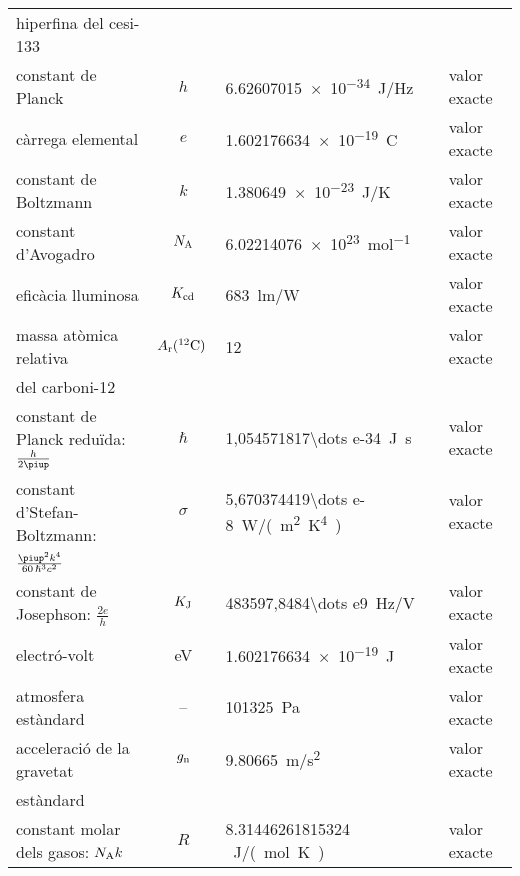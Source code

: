 \begin{ThreePartTable}
\begin{longtable}{lcll}
	hiperfina del cesi-133 & & & \index{$\Deltaup\nu\ped{Cs}$}\\[0.8em]
	constant de Planck & $h$ & \qty{6,62607015 e-34}{J/Hz} & valor exacte\index{constants!de Planck}\index{h@$h$}\\[0.8em]
	càrrega elemental & $e$ & \qty{1,602176634 e-19}{C} & valor exacte\index{carrega@càrrega!elemental}\index{e@$e$}\\[0.8em]
	constant de Boltzmann & $k$ & \qty{1,380649e-23}{J/K} & valor exacte\index{constants!de Boltzmann}\index{k@$k$}\\[0.8em]
	constant d'Avogadro\tnote{\color{blue}(a)} & $N\ped{A}$ & \qty{6,02214076 e23}{mol^{-1}} & valor exacte\index{constants!d'Avogadro}\index{NA@$N\ped{A}$}\\[0.8em]
	eficàcia lluminosa\tnote{\color{blue}(b)} & $K\ped{cd}$ & \qty{683}{lm/W} & valor exacte\index{eficàcia lluminosa}\index{Kcd@$K\ped{cd}$}\\[0.8em]
	massa atòmica relativa\tnote{\color{blue}(c)} & $A_\mathrm{r}({}^{12}\mathrm{C})\,$ & 12 & valor exacte\\
	del carboni-12 & & &\index{massa!atòmica relativa del carboni-12}\index{Ar@$A\ped{r}({}^{12}\mathrm{C})$}\\[0.8em]
	constant de Planck reduïda: $\frac{h}{2\piup}$ & $\hslash$ & \qty{1,054571817\dots e-34}{J.s} & valor exacte\index{constants!de Planck redu\"{i}da}\index{h@$\hslash$}\\[0.8em]
	constant d'Stefan-Boltzmann:  & $\sigma$ & \qty{5,670374419\dots e-8}{W/(m^2.K^4)} & valor exacte\index{constants!d'Stefan-Boltzmann}\index{$\sigma$}\\ 
	$\frac{\piup^2 k^4}{60\, \hslash^3 c^2}$ & & & \\[0.8em]
	constant de Josephson: $\frac{2 e}{h}$ & $K\ped{J}$ & \qty{483597,8484\dots e9}{Hz/V} & valor exacte\index{constants!de Josephson}\index{KJ@$K\ped{J}$}\\[0.9em]
	electró-volt\tnote{\color{blue}(d)} & eV & \qty{1,602176634e-19}{J} & valor exacte\index{electró-volt}\index{eV}\\[0.6em]
	atmosfera estàndard  & -- & \qty{101325}{Pa} & valor exacte\index{atmosfera estàndard}\\[0.8em]
	acceleració de la gravetat & $g\ped{n}$ & \qty{9,80665}{m/s^2} & valor exacte \\
	estàndard & & &\index{acceleració!de la gravetat estàndard}\index{gn@$g\ped{n}$}\\[0.9em]
	constant molar dels gasos: $N_\mathrm{A} k$ & $R$ & \qty{8,31446261815324}{\,J/(mol.K)} & valor exacte\index{constants!molar dels gasos}\index{R@$R$}\\[0.8em]

\end{longtable}
\end{ThreePartTable}
